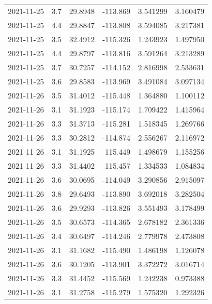 \begin{tabular}{lrrrrr}
2021-11-25 &       3.7 &  29.8948 &  -113.869 &         3.541299 &         3.160479 \\
2021-11-25 &       4.4 &  29.8847 &  -113.808 &         3.594085 &         3.217381 \\
2021-11-25 &       3.5 &  32.4912 &  -115.326 &         1.243923 &         1.497950 \\
2021-11-25 &       4.4 &  29.8797 &  -113.816 &         3.591264 &         3.213289 \\
2021-11-25 &       3.7 &  30.7257 &  -114.152 &         2.816998 &         2.533631 \\
2021-11-25 &       3.6 &  29.8583 &  -113.969 &         3.491084 &         3.097134 \\
2021-11-26 &       3.5 &  31.4012 &  -115.448 &         1.364880 &         1.100112 \\
2021-11-26 &       3.1 &  31.1923 &  -115.174 &         1.709422 &         1.415964 \\
2021-11-26 &       3.3 &  31.3713 &  -115.281 &         1.518345 &         1.269766 \\
2021-11-26 &       3.3 &  30.2812 &  -114.874 &         2.556267 &         2.116972 \\
2021-11-26 &       3.1 &  31.1925 &  -115.449 &         1.498679 &         1.155256 \\
2021-11-26 &       3.3 &  31.4402 &  -115.457 &         1.334533 &         1.084834 \\
2021-11-26 &       3.6 &  30.0695 &  -114.049 &         3.290856 &         2.915097 \\
2021-11-26 &       3.8 &  29.6493 &  -113.890 &         3.692018 &         3.282504 \\
2021-11-26 &       3.6 &  29.9293 &  -113.826 &         3.551493 &         3.178499 \\
2021-11-26 &       3.5 &  30.6573 &  -114.365 &         2.678182 &         2.361336 \\
2021-11-26 &       3.4 &  30.6497 &  -114.246 &         2.779978 &         2.473808 \\
2021-11-26 &       3.1 &  31.1682 &  -115.490 &         1.486198 &         1.126078 \\
2021-11-26 &       3.6 &  30.1205 &  -113.901 &         3.372272 &         3.016714 \\
2021-11-26 &       3.3 &  31.4452 &  -115.569 &         1.242238 &         0.973388 \\
2021-11-26 &       3.1 &  31.2758 &  -115.279 &         1.575320 &         1.292326 \\

\end{tabular}
